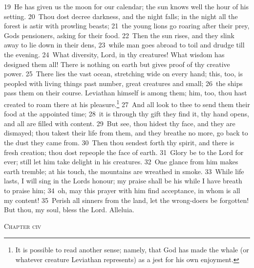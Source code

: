 \documentclass[10pt]{book} %
\begin{document}
\textcolor{benred8}{19}~He has given us the moon for our calendar; the sun knows well the hour of his setting. \textcolor{benred8}{20}~Thou dost decree darkness, and the night falls; in the night all the forest is astir with prowling beasts; \textcolor{benred8}{21}~the young lions go roaring after their prey, God\textquotesingle s pensioners, asking for their food. \textcolor{benred8}{22}~Then the sun rises, and they slink away to lie down in their dens, \textcolor{benred8}{23}~while man goes abroad to toil and drudge till the evening. \textcolor{benred8}{24}~What diversity, Lord, in thy creatures! What wisdom has designed them all! There is nothing on earth but gives proof of thy creative power.
\textcolor{benred8}{25}~There lies the vast ocean, stretching wide on every hand; this, too, is peopled with living things past number, great creatures and small; \textcolor{benred8}{26}~the ships pass them on their course. Leviathan himself is among them; him, too, thou hast created to roam there at his pleasure.\footnote[3]{It is possible to read another sense; namely, that God has made the whale (or whatever creature Leviathan represents) as a jest for his own enjoyment.} \textcolor{benred8}{27}~And all look to thee to send them their food at the appointed time; \textcolor{benred8}{28}~it is through thy gift they find it, thy hand opens, and all are filled with content. \textcolor{benred8}{29}~But see, thou hidest thy face, and they are dismayed; thou takest their life from them, and they breathe no more, go back to the dust they came from. \textcolor{benred8}{30}~Then thou sendest forth thy spirit, and there is fresh creation; thou dost repeople the face of earth.
\textcolor{benred8}{31}~Glory be to the Lord for ever; still let him take delight in his creatures. \textcolor{benred8}{32}~One glance from him makes earth tremble; at his touch, the mountains are wreathed in smoke. \textcolor{benred8}{33}~While life lasts, I will sing in the Lord\textquotesingle s honour; my praise shall be his while I have breath to praise him; \textcolor{benred8}{34}~oh, may this prayer with him find acceptance, in whom is all my content! \textcolor{benred8}{35}~Perish all sinners from the land, let the wrong-doers be forgotten! But thou, my soul, bless the Lord. Alleluia.
\begin{large}\begin{center}\textsc{Chapter civ}\end{center}\end{large}
\end{document}
